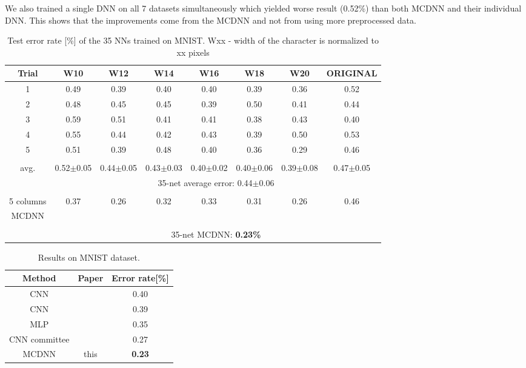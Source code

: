 \documentclass[a4paper]{article}
\begin{document}
We also trained a single DNN on all 7 datasets simultaneously which yielded worse result (0.52\%) than both MCDNN and their individual DNN. This shows that the improvements come from the MCDNN and not from using more preprocessed data.

\begin{table*}[ht!]
	\caption{Test error rate [\%] of the 35 NNs trained on MNIST. Wxx - width of the character is normalized to xx pixels}
	\label{tab:MNISTnets}
	\small
	\centering
  \begin{tabular}{c|ccccccc}
 Trial		&	W10 		& 	W12		&	W14		&	W16		&	W18		&	W20		&	ORIGINAL	\\
   \hline
1 & 0.49 & 0.39 & 0.40 & 0.40 & 0.39 & 0.36 & 0.52\\
2 & 0.48 & 0.45 & 0.45 & 0.39 & 0.50 & 0.41 & 0.44\\
3 & 0.59 & 0.51 & 0.41 & 0.41 & 0.38 & 0.43 & 0.40\\
4 & 0.55 & 0.44 & 0.42 & 0.43 & 0.39 & 0.50 & 0.53\\
5 & 0.51 & 0.39 & 0.48 & 0.40 & 0.36 & 0.29 & 0.46\\
\hline\\
avg. & 0.52$\pm$0.05 & 0.44$\pm$0.05 & 0.43$\pm$0.03 & 0.40$\pm$0.02 & 0.40$\pm$0.06 & 0.39$\pm$0.08 & 0.47$\pm$0.05 \\
&  \multicolumn{7}{c}{35-net average error: 0.44$\pm$0.06}\\
\hline \\
5 columns	& 0.37 & 0.26 & 0.32 & 0.33 & 0.31 & 0.26 & 0.46\\
MCDNN\\
\hline\\
& \multicolumn{7}{c}{35-net MCDNN: {\bf 0.23\%}}\\
  \end{tabular}
\end{table*}

\begin{table}[h]
\caption{Results on MNIST dataset.} 
\label{tab:MNISTresults}
\small
\begin{center}
\begin{tabular}{c|cc}
Method		&	Paper				&	Error rate[\%]\\
\hline
CNN			&	\cite{simard:2003}		&	0.40		\\
CNN			&	\cite{ranzato:2006}		&	0.39		\\
MLP				&	\cite{Ciresan:2010}		&	0.35		\\
CNN committee	&	\cite{Ciresan:2011c}	&	0.27		\\
MCDNN		&	this					&	\bf{0.23}
\end{tabular}
\end{center}
\end{table}
\end{document}
